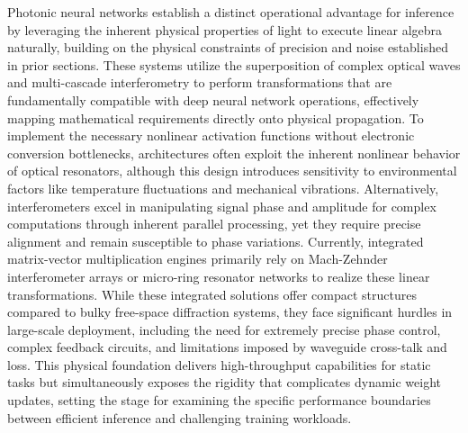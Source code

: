\documentclass[11pt]{article}
\begin{document}
Photonic neural networks establish a distinct operational advantage for inference by leveraging the inherent physical properties of light to execute linear algebra naturally, building on the physical constraints of precision and noise established in prior sections. These systems utilize the superposition of complex optical waves and multi-cascade interferometry to perform transformations that are fundamentally compatible with deep neural network operations, effectively mapping mathematical requirements directly onto physical propagation. \citep{doi_10_1007_s11075_025_02218_2_e396aae0} \citep{doi_10_48550_arxiv_2510_03186_c4d4955e} To implement the necessary nonlinear activation functions without electronic conversion bottlenecks, architectures often exploit the inherent nonlinear behavior of optical resonators, although this design introduces sensitivity to environmental factors like temperature fluctuations and mechanical vibrations. Alternatively, interferometers excel in manipulating signal phase and amplitude for complex computations through inherent parallel processing, yet they require precise alignment and remain susceptible to phase variations. Currently, integrated matrix-vector multiplication engines primarily rely on Mach-Zehnder interferometer arrays or micro-ring resonator networks to realize these linear transformations. \citep{doi_10_1117_12_2690776_82e594d2} \citep{doi_10_54254_2753_8818_2026_33628_f99a21e9} While these integrated solutions offer compact structures compared to bulky free-space diffraction systems, they face significant hurdles in large-scale deployment, including the need for extremely precise phase control, complex feedback circuits, and limitations imposed by waveguide cross-talk and loss. This physical foundation delivers high-throughput capabilities for static tasks but simultaneously exposes the rigidity that complicates dynamic weight updates, setting the stage for examining the specific performance boundaries between efficient inference and challenging training workloads. \citep{doi_10_3390_nano14080697_c372a140} \citep{s2_b765388f3cc18d6e5a0507522822def0e3503ec6_fa09b483} \citep{doi_10_1088_1402_4896_ae8345_3b948559}
\end{document}

